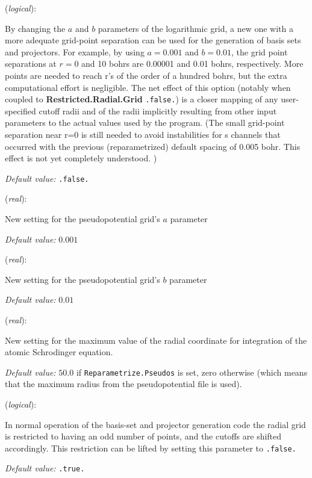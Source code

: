 \documentclass[11pt]{article}
\begin{document}
\begin{description}
\itemsep 10pt
\parsep 0pt

\item[{\bf Reparametrize.Pseudos}] ({\it logical}):

By changing the $a$ and $b$ parameters of the logarithmic grid, a new
one with a more adequate grid-point separation can be used for the
generation of basis sets and projectors. For example, by using
$a=0.001$ and $b=0.01$, the grid point separations at $r=0$ and 10
bohrs are 0.00001 and 0.01 bohrs, respectively. More points are needed
to reach r's of the order of a hundred bohrs, but the extra
computational effort is negligible.  The net effect of this option
(notably when coupled to {\bf Restricted.Radial.Grid} {\tt .false.})
is a closer mapping of any user-specified cutoff radii and of the
radii implicitly resulting from other input parameters to the actual
values used by the program. (The small grid-point separation near r=0
is still needed to avoid instabilities for s channels that occurred
with the previous (reparametrized) default spacing of 0.005 bohr. This
effect is not yet completely understood. )



{\it Default value:} { \tt .false.}

\item[{\bf New.A.Parameter}] ({\it real}):

New setting for the pseudopotential grid's $a$ parameter

{\it Default value:} { $0.001$}

\item[{\bf New.B.Parameter}] ({\it real}):

New setting for the pseudopotential grid's $b$ parameter

{\it Default value:} { $0.01$}

\item[{\bf Rmax.Radial.Grid}] ({\it real}):

New setting for the maximum value of the radial coordinate for
integration of the atomic Schrodinger equation.

{\it Default value:} { $50.0$} if {\tt Reparametrize.Pseudos} is set,
zero otherwise (which means that the maximum radius from the pseudopotential
file is used).

\item[{\bf Restricted.Radial.Grid}] ({\it logical}):

In normal operation of the basis-set and projector generation code the
radial grid is restricted to having an odd number of points, and the
cutoffs are shifted accordingly. This restriction can be lifted by
setting this parameter to {\tt .false.}

{\it Default value:} { \tt .true.}
\end{description}
\end{document}
